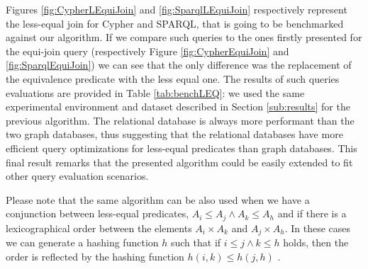 Figures \ref{fig:CypherLEquiJoin} and \ref{fig:SparqlLEquiJoin} respectively represent the less-equal join for Cypher and SPARQL, that is going to be benchmarked against our algorithm. If we compare such queries to the ones firstly presented for the equi-join query (respectively Figure \vref{fig:CypherEquiJoin} and \ref{fig:SparqlEquiJoin}) we can see that the only difference was the replacement of the equivalence predicate with the less equal one.  The results of such queries evaluations are provided in Table \ref{tab:benchLEQ}: we used the same experimental environment and dataset described in Section \vref{sub:results} for the previous algorithm. The relational database is always more performant than the two graph databases, thus suggesting that the relational databases have more efficient query optimizations for less-equal  predicates than graph databases. This final result remarks that the presented algorithm could be easily extended to fit other query evaluation scenarios.

Please note that the same algorithm can be also used when we have a conjunction between less-equal predicates, $A_i\leq A_j\wedge A_k\leq A_h$ and if there is a lexicographical order between the elements ${A_i\times A_k}$ and $A_j\times A_h$. In these cases we can generate a hashing function $h$ such that if $i\leq j \wedge k\leq h$ holds, then the order is reflected by the hashing function $h(i,k)\leq h(j,h)$ \cite{BelazzouguiBPV11}.
